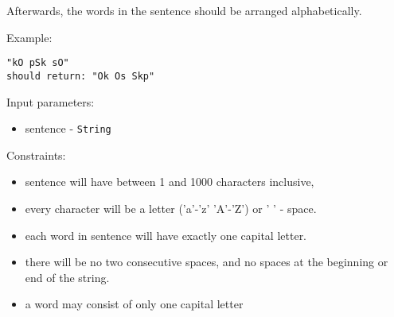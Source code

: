 \begin{questions}
Afterwards, the words in the sentence should be arranged alphabetically.

Example:
\begin{verbatim}
"kO pSk sO"
should return: "Ok Os Skp"
\end{verbatim}

Input parameters:
\begin{itemize}
  \item sentence - \texttt{String} 
\end{itemize}
  
          
Constraints:
\begin{itemize}
  \item sentence will have between 1 and 1000 characters inclusive,
  \item every character will be a letter ('a'-'z' 'A'-'Z') or ' ' - space.
  \item each word in sentence will have exactly one capital letter.
  \item there will be no two consecutive spaces, and no spaces at the beginning
  or end of the string.
  \item a word may consist of only one capital letter 
\end{itemize}



\end{questions}


